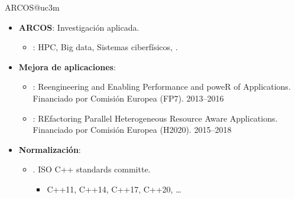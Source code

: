 \begin{frame}{ARCOS@uc3m}
\begin{itemize}
  \item \textbf{ARCOS}: Investigación aplicada.
    \begin{itemize}
      \item {\color{blue}{Líneas}}: 
        HPC,
        Big data,
        Sistemas ciberfísicos,
        .
    \end{itemize} 
  \vfill
  \item \textbf{Mejora de aplicaciones}:
    \begin{itemize}
      \item {}: Reengineering and Enabling Performance and poweR of Applications.
            Financiado por Comisión Europea (FP7). 2013--2016
      \item {}: REfactoring Parallel Heterogeneous Resource Aware Applications.
            Financiado por Comisión Europea (H2020). 2015--2018
    \end{itemize} 
  \vfill
  \item \textbf{Normalización}:
    \begin{itemize}
      \item {}. ISO C++ standards committe.
        \begin{itemize}
          \item C++11, C++14, C++17, C++20, \ldots
        \end{itemize}
    \end{itemize}
\end{itemize}
\end{frame}
